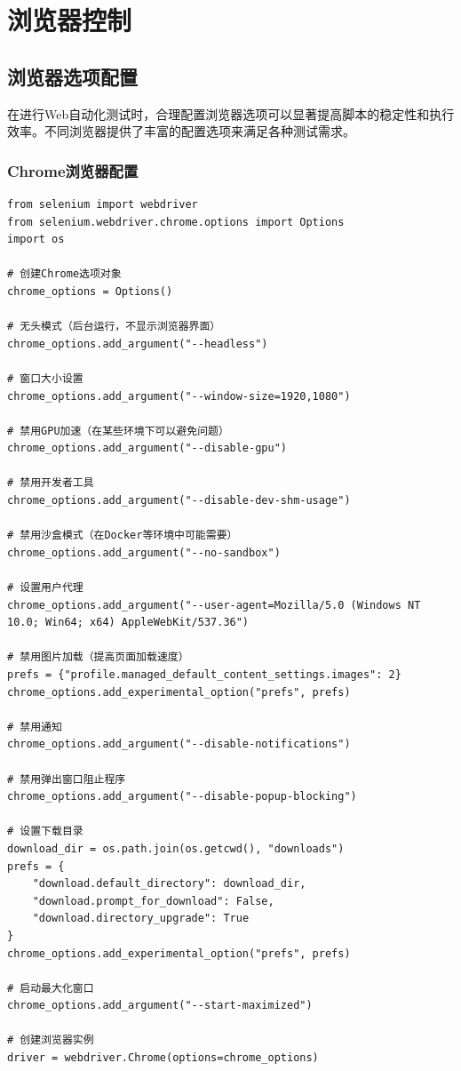 \chapter{浏览器控制}

\section{浏览器选项配置}

在进行Web自动化测试时，合理配置浏览器选项可以显著提高脚本的稳定性和执行效率。不同浏览器提供了丰富的配置选项来满足各种测试需求。

\subsection{Chrome浏览器配置}

\begin{lstlisting}[style=demostyle,numbers=none]
from selenium import webdriver
from selenium.webdriver.chrome.options import Options
import os

# 创建Chrome选项对象
chrome_options = Options()

# 无头模式（后台运行，不显示浏览器界面）
chrome_options.add_argument("--headless")

# 窗口大小设置
chrome_options.add_argument("--window-size=1920,1080")

# 禁用GPU加速（在某些环境下可以避免问题）
chrome_options.add_argument("--disable-gpu")

# 禁用开发者工具
chrome_options.add_argument("--disable-dev-shm-usage")

# 禁用沙盒模式（在Docker等环境中可能需要）
chrome_options.add_argument("--no-sandbox")

# 设置用户代理
chrome_options.add_argument("--user-agent=Mozilla/5.0 (Windows NT 10.0; Win64; x64) AppleWebKit/537.36")

# 禁用图片加载（提高页面加载速度）
prefs = {"profile.managed_default_content_settings.images": 2}
chrome_options.add_experimental_option("prefs", prefs)

# 禁用通知
chrome_options.add_argument("--disable-notifications")

# 禁用弹出窗口阻止程序
chrome_options.add_argument("--disable-popup-blocking")

# 设置下载目录
download_dir = os.path.join(os.getcwd(), "downloads")
prefs = {
    "download.default_directory": download_dir,
    "download.prompt_for_download": False,
    "download.directory_upgrade": True
}
chrome_options.add_experimental_option("prefs", prefs)

# 启动最大化窗口
chrome_options.add_argument("--start-maximized")

# 创建浏览器实例
driver = webdriver.Chrome(options=chrome_options)
\end{lstlisting}

